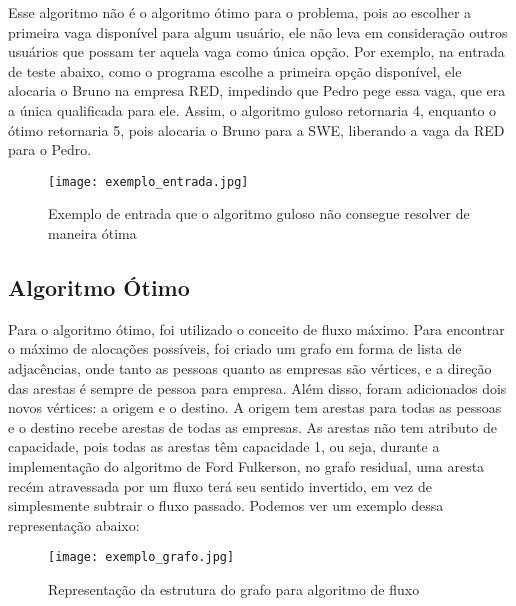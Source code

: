 \documentclass[12pt]{article}
\begin{document}
		\par Esse algoritmo não é o algoritmo ótimo para o problema, pois ao escolher a primeira vaga disponível para algum usuário, ele não leva em consideração outros usuários que possam ter aquela vaga como única opção. Por exemplo, na entrada de teste abaixo, como o programa escolhe a primeira opção disponível, ele alocaria o Bruno na empresa RED, impedindo que Pedro pege essa vaga, que era a única qualificada para ele. Assim, o algoritmo guloso retornaria 4, enquanto o ótimo retornaria 5, pois alocaria o Bruno para a SWE, liberando a vaga da RED para o Pedro.

		\begin{figure}[H]
			\centering
			\texttt{[image: exemplo\_entrada.jpg]}
			\caption{Exemplo de entrada que o algoritmo guloso não consegue resolver de maneira ótima}
			\label{exemplo_entrada}
		\end{figure}

	\subsection{Algoritmo Ótimo}

		\par Para o algoritmo ótimo, foi utilizado o conceito de fluxo máximo. Para encontrar o máximo de alocações possíveis, foi criado um grafo em forma de lista de adjacências, onde tanto as pessoas quanto as empresas são vértices, e a direção das arestas é sempre de pessoa para empresa. Além disso, foram adicionados dois novos vértices: a origem e o destino. A origem tem arestas para todas as pessoas e o destino recebe arestas de todas as empresas. As arestas não tem atributo de capacidade, pois todas as arestas têm capacidade 1, ou seja, durante a implementação do algoritmo de Ford Fulkerson, no grafo residual, uma aresta recém atravessada por um fluxo terá seu sentido invertido, em vez de simplesmente subtrair o fluxo passado. Podemos ver um exemplo dessa representação abaixo:

		\begin{figure}[H]
			\centering
			\texttt{[image: exemplo\_grafo.jpg]}
			\caption{Representação da estrutura do grafo para algoritmo de fluxo}
			\label{exemplo_grafo}
		\end{figure}
\end{document}
